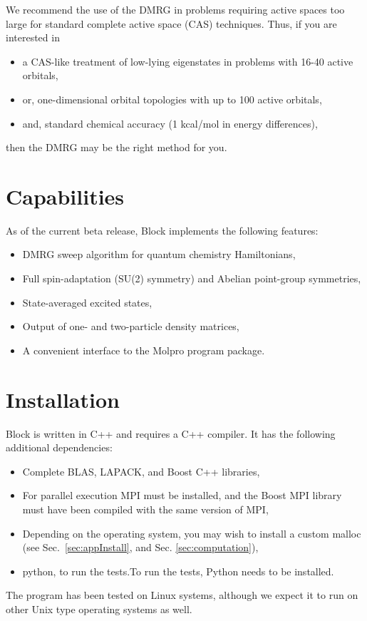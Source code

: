 \documentclass[letterpaper,12pt,aps, pra]{revtex4-1}
\begin{document}
We recommend the use of the DMRG in problems requiring active spaces too large for standard 
complete active space (CAS) techniques. Thus, if you are interested in
\begin{itemize}
\item a CAS-like treatment of low-lying eigenstates in problems with 16-40 active orbitals,
\item or, one-dimensional orbital topologies with up to 100 active orbitals,
\item and, standard chemical accuracy (1 kcal/mol in energy differences),
\end{itemize}
then the DMRG may be the right method for you.

\section{Capabilities}

As of the current beta release, Block implements the following features:
\begin{itemize}
\item DMRG sweep algorithm for quantum chemistry Hamiltonians,
\item Full spin-adaptation (SU(2) symmetry) and Abelian point-group symmetries,
\item State-averaged excited states,
\item Output of one- and two-particle density matrices,
\item A convenient interface to the Molpro program package.
\end{itemize}

\section{Installation}\label{sec:install}
Block is written in C++ and requires a C++ compiler. It has the following additional dependencies:
\begin{itemize}
\item Complete BLAS, LAPACK, and Boost C++ libraries,
\item For parallel execution MPI must be installed, and the Boost MPI library must have been compiled with the same version of MPI,
\item Depending on the operating system, you may wish to install a custom malloc (see Sec.~\ref{sec:appInstall}, and Sec. \ref{sec:computation}),
\item python, to run the tests.To run the tests, Python needs to be installed.
\end{itemize}
The program has been tested on Linux systems, although we expect it to run on other Unix type operating systems as well. 
\end{document}
